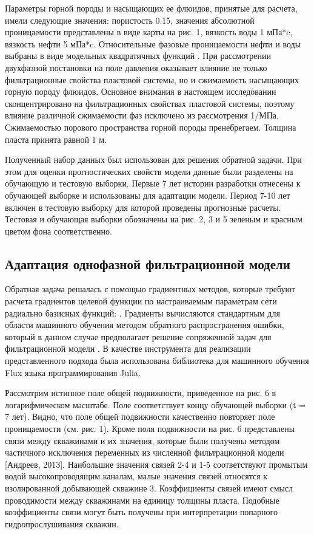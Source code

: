 \documentclass{article}
\begin{document}
Параметры горной породы и насыщающих ее флюидов, принятые для расчета, имели следующие значения: пористость 0.15, значения абсолютной проницаемости представлены в виде карты на рис. 1, вязкость воды 1 мПа*c, вязкость нефти 5 мПа*c. Относительные фазовые проницаемости нефти и воды выбраны в виде модельных квадратичных функций . При рассмотрении двухфазной постановки на поле давления оказывает влияние не только фильтрационные свойства пластовой системы, но и сжимаемость насыщающих горную породу флюидов. Основное внимания в настоящем исследовании сконцентрировано на фильтрационных свойствах пластовой системы, поэтому влияние различной сжимаемости фаз исключено из рассмотрения  1/МПа. Сжимаемостью порового пространства горной породы  пренебрегаем. Толщина пласта принята равной 1 м.

Полученный набор данных был использован для решения обратной задачи. При этом для оценки прогностических свойств модели данные были разделены на обучающую и тестовую выборки. Первые 7 лет истории разработки отнесены к обучающей выборке и использованы для адаптации модели. Период 7-10 лет включен в тестовую выборку для которой проведены прогнозные расчеты. Тестовая и обучающая выборки обозначены на рис. 2, 3 и 5 зеленым и красным цветом фона соответственно.


\subsection{Адаптация однофазной фильтрационной модели}




Обратная задача решалась с помощью градиентных методов, которые требуют расчета градиентов целевой функции по настраиваемым параметрам сети радиально базисных функций: . Градиенты вычисляются стандартным для области машинного обучения методом обратного распространения ошибки, который в данном случае предполагает решение сопряженной задач для фильтрационной модели \cite{far}. В качестве инструмента для реализации представленного подхода была использована библиотека для машинного обучения Flux \cite{inn} языка программирования Julia.

Рассмотрим истинное поле общей подвижности, приведенное на рис. 6 в логарифмическом масштабе. Поле соответствует концу обучающей выборки (t = 7 лет). Видно, что поле общей подвижности качественно повторяет поле проницаемости (см. рис. 1). Кроме поля подвижности на рис. 6 представлены связи между скважинами и их значения, которые были получены методом частичного исключения переменных из численной фильтрационной модели [Андреев, 2013]. Наибольшие значения связей 2-4 и 1-5 соответствуют промытым водой высокопроводящим каналам, малые значения связей относятся к изолированной добывающей скважине 3. Коэффициенты связей имеют смысл проводимости между скважинами на единицу толщины пласта. Подобные коэффициенты связи могут быть получены при интерпретации попарного гидропрослушивания скважин.
\end{document}
